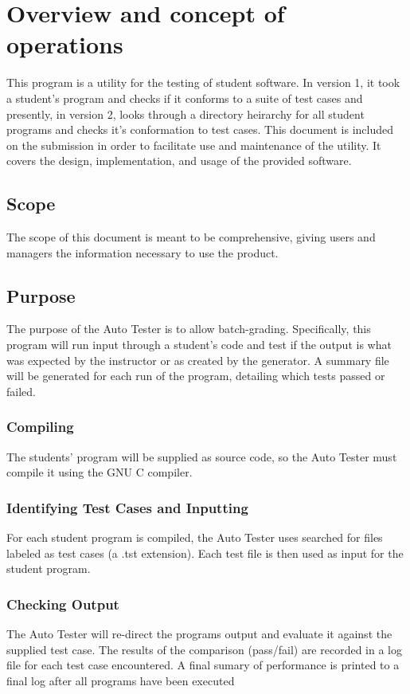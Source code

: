 
\chapter{Overview and concept of operations}

This program is a utility for the testing of student software. In version 1, it took a student's program and checks if it conforms to a suite of test cases and presently, in version 2, looks through a directory heirarchy for all student programs and checks it's conformation to test cases. This document is included on the submission in order to facilitate use and maintenance of the utility. It covers the design, implementation, and usage of the provided software.

\section{Scope}
The scope of this document is meant to be comprehensive, giving users and managers the information necessary to use the product.

\section{Purpose}
The purpose of the Auto Tester is to allow batch-grading. Specifically, this program will run input through a student's code and test if the output is what was expected by the instructor or as created by the generator. A summary file will be generated for each run of the program, detailing which tests passed or failed.


\subsection{Compiling}
The students' program will be supplied as source code, so the Auto Tester must compile it using the GNU C compiler.


\subsection{Identifying Test Cases and Inputting}
For each student program is compiled, the Auto Tester uses searched for files labeled as test cases (a .tst extension). Each test file is then used as input for the student program.


\subsection{Checking Output}
The Auto Tester will re-direct the programs output and evaluate it against the supplied test case. The results of the comparison (pass/fail) are recorded in a log file for each test case encountered.  A final sumary of performance is printed to a final log after all programs have been executed


